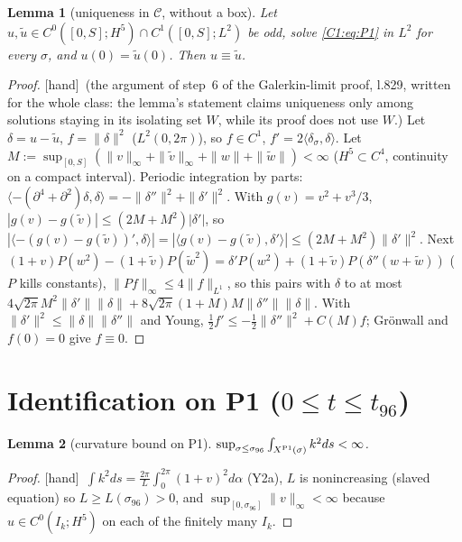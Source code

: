\documentclass[11pt]{article}
\newtheorem{lemma}{Lemma}[section]\newtheorem{proposition}[lemma]{Proposition}\newtheorem{theorem}[lemma]{Theorem}\newtheorem{remark}[lemma]{Remark}
\newcommand{\fn}[1]{\texttt{\detokenize{#1}}}
\newcommand{\tH}{\textup{[hand]}}\newcommand{\tS}{\textup{[sym]}}\newcommand{\tC}{\textup{[cert]}}\newcommand{\tI}{\textup{[cited]}}\newcommand{\tN}{\textup{[num]}}
\newcommand{\ip}[2]{\langle#1,#2\rangle}
\begin{document}
\begin{lemma}[uniqueness in $\mathcal C$, without a box]\label{C1:lem:uniq}
Let $u,\tilde u\in C^0([0,S];H^5)\cap C^1([0,S];L^2)$ be odd, solve \eqref{C1:eq:P1} in $L^2$ for every $\sigma$, and $u(0)=\tilde u(0)$. Then $u\equiv\tilde u$.
\end{lemma}
\begin{proof}\tH\ (the argument of step~6 of the Galerkin-limit proof, \fn{step4_proof.tex} l.829, written for the whole class: the lemma's statement claims uniqueness only among solutions staying in its isolating set $W$, while its proof does not use $W$.) Let $\delta=u-\tilde u$, $f=\|\delta\|^2$ ($L^2(0,2\pi)$), so $f\in C^1$, $f'=2\ip{\delta_\sigma}{\delta}$. Let $M:=\sup_{[0,S]}(\|v\|_\infty+\|\tilde v\|_\infty+\|w\|+\|\tilde w\|)<\infty$ ($H^5\subset C^4$, continuity on a compact interval). Periodic integration by parts: $\ip{-(\partial^4+\partial^2)\delta}{\delta}=-\|\delta''\|^2+\|\delta'\|^2$. With $g(v)=v^2+v^3/3$, $|g(v)-g(\tilde v)|\le(2M+M^2)|\delta'|$, so $|\ip{-(g(v)-g(\tilde v))'}{\delta}|=|\ip{g(v)-g(\tilde v)}{\delta'}|\le(2M+M^2)\|\delta'\|^2$. Next $(1+v)P(w^2)-(1+\tilde v)P(\tilde w^2)=\delta'P(w^2)+(1+\tilde v)P(\delta''(w+\tilde w))$ ($P$ kills constants), $\|Pf\|_\infty\le4\|f\|_{L^1}$, so this pairs with $\delta$ to at most $4\sqrt{2\pi}M^2\|\delta'\|\|\delta\|+8\sqrt{2\pi}(1+M)M\|\delta''\|\|\delta\|$. With $\|\delta'\|^2\le\|\delta\|\|\delta''\|$ and Young, $\frac12f'\le-\frac12\|\delta''\|^2+C(M)f$; Gr\"onwall and $f(0)=0$ give $f\equiv0$.
\end{proof}

\section{Identification on P1 ($0\le t\le t_{96}$)}
\begin{lemma}[curvature bound on P1]\label{C1:lem:kP1}
$\sup_{\sigma\le\sigma_{96}}\int_{X^{\rm P1}(\sigma)}k^2ds<\infty$.
\end{lemma}
\begin{proof}\tH\ $\int k^2ds=\frac{2\pi}L\int_0^{2\pi}(1+v)^2d\alpha$ (Y2a), $L$ is nonincreasing (slaved equation) so $L\ge L(\sigma_{96})>0$, and $\sup_{[0,\sigma_{96}]}\|v\|_\infty<\infty$ because $u\in C^0(I_k;H^5)$ on each of the finitely many $I_k$.
\end{proof}
\end{document}
